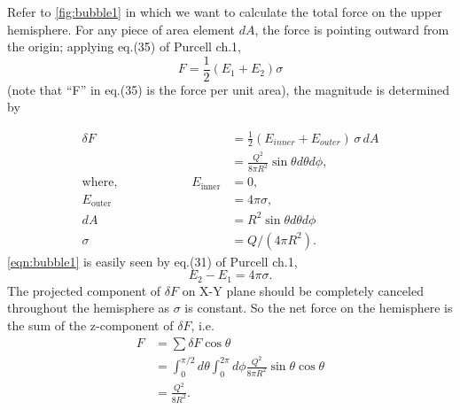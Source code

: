 \documentclass{esg8022pset}
\begin{document}
\begin{solution}
  Refer to \autoref{fig:bubble1} in which we want to calculate the
  total force on the upper hemisphere.  For any piece of area element
  $dA$, the force is pointing outward from the origin; applying eq.(35) of
  Purcell ch.1,
  \begin{equation*} F = \frac12 (E_1 + E_2)\sigma \end{equation*}
  (note that ``F'' in eq.(35) is the force per unit area), 
  the magnitude is determined by 

  \begin{align}
    \delta F & = \frac{1}{2}(E_{inner}+E_{outer})\, \sigma\, dA \nonumber \\
             & = \frac{Q^2}{8\pi R^2}\sin{\theta}d\theta d\phi, \nonumber \\
    \text{where,}\qquad\qquad\qquad E_{\text{inner}} & = 0,\nonumber\\
    E_{\text{outer}} & = 4\pi\sigma,\label{eqn:bubble1}\\
    dA & = R^2\sin{\theta}d\theta d\phi \nonumber\\
    \sigma & = Q/(4\pi R^2). \nonumber
  \end{align}
  \autoref{eqn:bubble1} is easily seen by eq.(31) of Purcell ch.1,
  \begin{equation*} E_2 - E_1 = 4 \pi \sigma. \end{equation*}
  The projected
  component of $\delta F$ on X-Y plane should be completely canceled throughout
  the hemisphere as $\sigma$ is constant.  So the net force on the
  hemisphere is the sum of the z-component of $\delta F$, i.e.
  \begin{align*}
    F & = \sum \delta F\cos{\theta} \\
      & = \int_0^{\pi/2}d\theta\int_0^{2\pi}d\phi\frac{Q^2}{8\pi
    R^2}\sin{\theta}\cos{\theta}\\
      & = \frac{Q^2}{8R^2}.
  \end{align*}
\end{solution}
\end{document}

